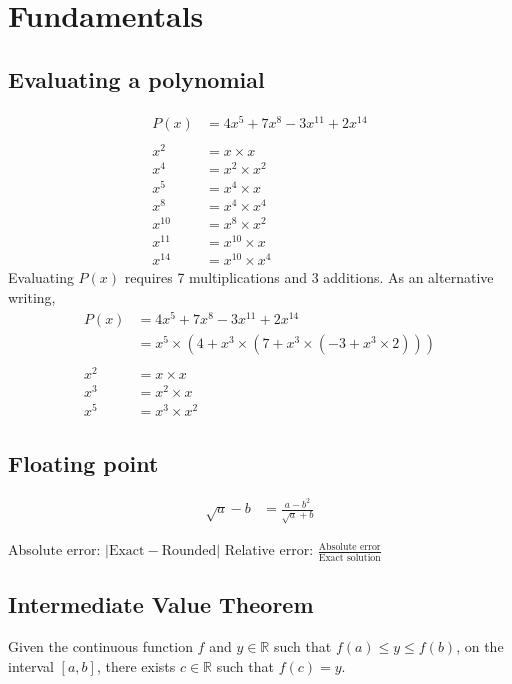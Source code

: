 \documentclass[12pt]{article}
\newcommand{\straight}[1]{\left|       #1 \right|}
\begin{document}
\section*{Fundamentals}

\subsection*{Evaluating a polynomial}
\begin{align*}
    P(x) &= 4x^5 + 7x^8 - 3x^{11} + 2x^{14} \\
    \\
    x^2 &= x \times x \\
    x^4 &= x^2 \times x^2 \\
    x^5 &= x^4 \times x \\
    x^8 &= x^4 \times x^4 \\
    x^{10} &= x^8 \times x^2 \\
    x^{11} &= x^{10} \times x \\
    x^{14} &= x^{10} \times x^4
\end{align*}
Evaluating $P(x)$ requires 7 multiplications and 3 additions. As an alternative writing,
\begin{align*}
    P(x) &= 4x^5 + 7x^8 - 3x^{11} + 2x^{14} \\
    &= x^5 \times (4 + x^3 \times (7 + x^3 \times (-3 + x^3 \times 2))) \\
    \\
    x^2 &= x \times x \\
    x^3 &= x^2 \times x \\
    x^5 &= x^3 \times x^2
\end{align*}

\subsection*{Floating point}
\begin{align*}
    \sqrt{a} - b &= \frac{a - b^2}{\sqrt{a} + b}
\end{align*}

Absolute error: $\straight{\text{Exact} - \text{Rounded}}$
Relative error: $\frac{\text{Absolute error}}{\text{Exact solution}}$

\subsection*{Intermediate Value Theorem}
Given the continuous function $f$ and $y \in \mathbb{R}$ such that $f(a) \leq y \leq f(b)$, on the interval $[a, b]$, there exists $c \in \mathbb{R}$ such that $f(c) = y$.
\end{document}

